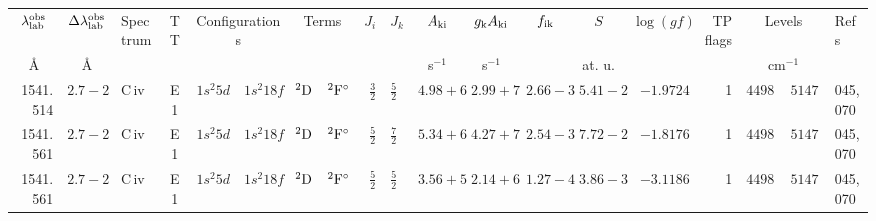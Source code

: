 



\begin{table*}
\begin{tabular}{rrlcr@{ -- }lr@{ -- }lr@{ -- }lllllrrr@{ -- }rl}
\hline
\multicolumn{1}{c}{$\lambda_{\rm lab}^{\rm obs}$\phantom{0000}} & \multicolumn{1}{c}{$\Delta\lambda_{\rm lab}^{\rm obs}$} & Spectrum & TT & \multicolumn{2}{c}{Configurations} & \multicolumn{2}{c}{Terms} & $J_i$ & $J_k$ & \multicolumn{1}{c}{$A_{\rm ki}$} & \multicolumn{1}{c}{$g_{\rm k} A_{\rm ki}$} & \multicolumn{1}{c}{$f_{\rm ik}$} & \multicolumn{1}{c}{$S$} & \multicolumn{1}{c}{$\log(gf)$} & TP flags & \multicolumn{2}{c}{Levels} & Refs \\
\multicolumn{1}{c}{\AA\phantom{0000}} & \multicolumn{1}{c}{\AA} & & & \multicolumn{2}{c}{} & \multicolumn{2}{c}{} & \multicolumn{2}{c}{} & \multicolumn{1}{c}{s$^{-1}$} & \multicolumn{1}{c}{s$^{-1}$} & & \multicolumn{1}{c}{at. u.} & & & \multicolumn{2}{c}{cm$^{-1}$} & \\
\hline
   1541.514\phantom{0000000} & $2.7-2$ & C\,{\sc iv} & E1 &  $1s^{2}5d$ & $1s^{2}18f$ &       $^{2}{\rm D}$ & $^{2}{\rm F}^\circ$ &  $\frac{3}{2}$ & $\frac{5}{2}$  & $4.98+6$ & $2.99+7$ & $2.66-3$ & $5.41-2$ & $ -1.9724$ &     1 & $449885.50$ & $514756.80$ & 045,070 \\
   1541.561\phantom{0000000} & $2.7-2$ & C\,{\sc iv} & E1 &  $1s^{2}5d$ & $1s^{2}18f$ &       $^{2}{\rm D}$ & $^{2}{\rm F}^\circ$ &  $\frac{5}{2}$ & $\frac{7}{2}$  & $5.34+6$ & $4.27+7$ & $2.54-3$ & $7.72-2$ & $ -1.8176$ &     1 & $449887.50$ & $514756.80$ & 045,070 \\
   1541.561\phantom{0000000} & $2.7-2$ & C\,{\sc iv} & E1 &  $1s^{2}5d$ & $1s^{2}18f$ &       $^{2}{\rm D}$ & $^{2}{\rm F}^\circ$ &  $\frac{5}{2}$ & $\frac{5}{2}$  & $3.56+5$ & $2.14+6$ & $1.27-4$ & $3.86-3$ & $ -3.1186$ &     1 & $449887.50$ & $514756.80$ & 045,070 \\

\end{tabular}
\end{table*}
